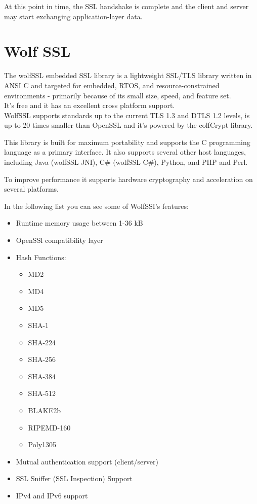 \documentclass[a4paper,12pt]{report}
\begin{document}
\begin{itemize}
\begin{enumerate}
\end{enumerate}
\end{itemize}

At this point in time, the SSL handshake is complete and the client and server may start exchanging application-layer data.

\chapter{Wolf SSL}
The wolfSSL embedded SSL library is a lightweight SSL/TLS library written in ANSI C and targeted for embedded, RTOS, and resource-constrained
environments - primarily because of its small size, speed, and feature set.
\\It's free and it has an excellent cross platform support.
\\WolfSSL supports standards up to the current TLS 1.3 and DTLS 1.2 levels, is up to
20 times smaller than OpenSSL and it's powered by the colfCrypt library.

\vspace{5mm} %
This library is built for maximum portability and supports the C programming language as a primary interface. It also supports several other host languages, including Java (wolfSSL JNI), C\# (wolfSSL C\#), Python, and PHP and Perl.

\vspace{5mm} %
To improve performance it supports hardware cryptography and acceleration on several platforms.

\vspace{5mm} %
In the following list you can see some of WolfSSI’s features:
\begin{itemize}
\item Runtime memory usage between 1-36 kB
\item OpenSSl compatibility layer
\item Hash Functions: \begin{multicols}{3}\begin{itemize}
\item MD2
\item MD4
\item MD5
\item SHA-1
\item SHA-224
\item SHA-256
\item SHA-384
\item SHA-512
\item BLAKE2b
\item RIPEMD-160
\item Poly1305
\end{itemize}
\end{multicols}
\item Mutual authentication support (client/server)
\item SSL Sniffer (SSL Inspection) Support
\item IPv4 and IPv6 support


\end{itemize}
\end{document}

